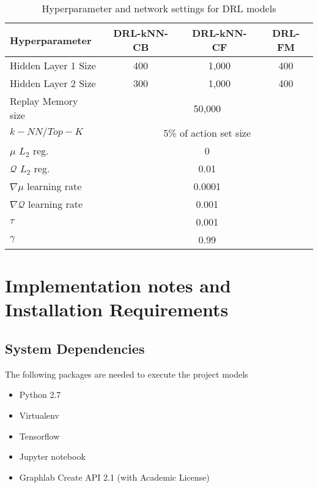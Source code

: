 \begin{table}[!htbp]
\centering
\begin{tabular}{ |l|c|c|c| }
  \hline
  \textbf{Hyperparameter}& \textbf{DRL-kNN-CB} & \textbf{DRL-kNN-CF} & \textbf{DRL-FM} \\
  \hline
  Hidden Layer 1 Size & 400 & 1,000 & 400 \\ \hline
  Hidden Layer 2 Size & 300 & 1,000 & 400 \\ \hline
  Replay Memory size & \multicolumn{3}{c|}{50,000} \\ \hline
  $k-NN/Top-K$ & \multicolumn{3}{c|}{5\% of action set size} \\ \hline
  $\mu$ $L_2$ reg. & \multicolumn{3}{c|}{0} \\ \hline
  $\mathcal{Q}$ $L_2$ reg. & \multicolumn{3}{c|}{0.01} \\ \hline
  $\nabla \mu$ learning rate & \multicolumn{3}{c|}{0.0001} \\ \hline
  $\nabla \mathcal{Q}$ learning rate & \multicolumn{3}{c|}{0.001} \\ \hline
  $\tau$ & \multicolumn{3}{c|}{0.001} \\
  $\gamma$ & \multicolumn{3}{c|}{0.99} \\
  \hline
\end{tabular}
\caption{Hyperparameter and network settings for DRL models}
\label{table:hyperparameters}
\end{table}

\chapter{Implementation notes and Installation Requirements}
\label{app:implementation}

\section{System Dependencies}

The following packages are needed to execute the project models

\begin{itemize}
\item Python 2.7
\item Virtualenv
\item Tensorflow
\item Jupyter notebook
\item Graphlab Create API 2.1 (with Academic License)
\end{itemize}


